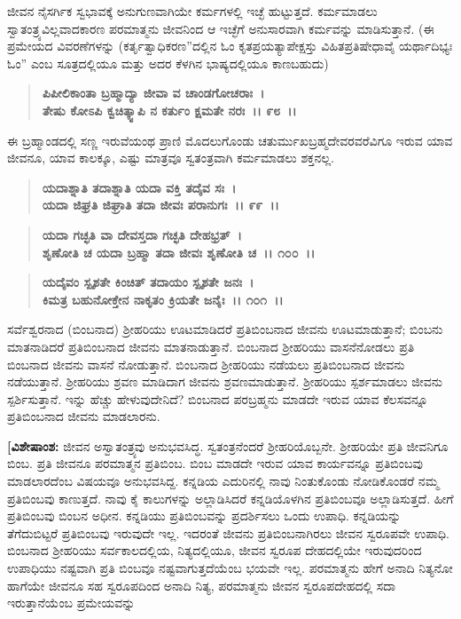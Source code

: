 ಜೀವನ ನೈಸರ್ಗಿಕ ಸ್ವಭಾವಕ್ಕೆ ಅನುಗುಣವಾಗಿಯೇ ಕರ್ಮಗಳಲ್ಲಿ ಇಚ್ಛೆ ಹುಟ್ಟುತ್ತದೆ. ಕರ್ಮಮಾಡಲು ಸ್ವಾತಂತ್ರ್ಯವಿಲ್ಲವಾದಕಾರಣ ಪರಮಾತ್ಮನು ಜೀವನಿಂದ ಆ ಇಚ್ಛೆಗೆ ಅನುಸಾರವಾಗಿ ಕರ್ಮವನ್ನು ಮಾಡಿಸುತ್ತಾನೆ. (ಈ ಪ್ರಮೇಯದ ವಿವರಣೆಗಳನ್ನು (ಕರ್ತೃತ್ವಾಧಿಕರಣ”ದಲ್ಲಿನ ಓಂ ಕೃತಪ್ರಯತ್ಯಾಪೇಕ್ಷಸ್ತು ವಿಹಿತಪ್ರತಿಷೇಧಾವೈ ಯರ್ಥಾದಿಭ್ಯಃ ಓಂ” ಎಂಬ ಸೂತ್ರದಲ್ಲಿಯೂ ಮತ್ತು ಅದರ ಕೆಳಗಿನ ಭಾಷ್ಯದಲ್ಲಿಯೂ ಕಾಣಬಹುದು)

\begin{verse}
\textbf{ಪಿಪೀಲಿಕಾಂತಾ ಬ್ರಹ್ಮಾದ್ಯಾ ಜೀವಾ ವ ಚಾಂಡಗೋಚರಾಃ~।}\\\textbf{ತೇಷು ಕೋಽಪಿ ಕ್ವಚಿತ್ಕ್ವಾಪಿ ನ ಕರ್ತುಂ ಕ್ಷಮತೇ ನರಃ~।। ೯೮~।।}
\end{verse}

ಈ ಬ್ರಹ್ಮಾಂಡದಲ್ಲಿ ಸಣ್ಣ ಇರುವೆಯಂಥ ಪ್ರಾಣಿ ಮೊದಲುಗೊಂಡು ಚತುರ್ಮುಖಬ್ರಹ್ಮದೇವರವರೆವಿಗೂ ಇರುವ ಯಾವ ಜೀವನೂ, ಯಾವ ಕಾಲಕ್ಕೂ, ಎಷ್ಟು ಮಾತ್ರವೂ ಸ್ವತಂತ್ರವಾಗಿ ಕರ್ಮಮಾಡಲು ಶಕ್ತನಲ್ಲ.

\begin{verse}
\textbf{ಯದಾಶ್ನಾತಿ ತದಾಶ್ನಾತಿ ಯದಾ ವಕ್ತಿ ತದೈವ ಸಃ~।}\\\textbf{ಯದಾ ಜಿಘ್ರತಿ ಜಿಘ್ರಾತಿ ತದಾ ಜೀವಃ ಪರಾನುಗಃ~।। ೯೯~।।} 
\end{verse}

\begin{verse}
\textbf{ಯದಾ ಗಚ್ಛತಿ ವಾ ದೇವಸ್ತದಾ ಗಚ್ಛತಿ ದೇಹಭ್ರತ್~।}\\\textbf{ಶೃಣೋತಿ ಚ ಯದಾ ಬ್ರಹ್ಮಾ ತದಾ ಜೀವಃ ಶೃಣೋತಿ ಚ~।। ೧೦೦~।।} 
\end{verse}

\begin{verse}
\textbf{ಯದೈವಂ ಸ್ಪೃಶತೇ ಕಿಂಚಿತ್ ತದಾಯಂ ಸ್ಪೃಶತೇ ಜನಃ~।}\\\textbf{ಕಿಮತ್ರ ಬಹುನೋಕ್ತೇನ ನಾಕೃತಂ ಕ್ರಿಯತೇ ಜನೈಃ~।। ೧೦೧~।।}
\end{verse}

ಸರ್ವೆಶ್ವರನಾದ (ಬಿಂಬನಾದ) ಶ‍್ರೀಹರಿಯು ಊಟಮಾಡಿದರೆ ಪ್ರತಿಬಿಂಬನಾದ ಜೀವನು ಊಟಮಾಡುತ್ತಾನೆ; ಬಿಂಬನು ಮಾತನಾಡಿದರೆ ಪ್ರತಿಬಿಂಬನಾದ ಜೀವನು ಮಾತ\-ನಾಡುತ್ತಾನೆ. ಬಿಂಬನಾದ ಶ‍್ರೀಹರಿಯು ವಾಸನೆನೋಡಲು ಪ್ರತಿ ಬಿಂಬನಾದ ಜೀವನು ವಾಸನೆ ನೋಡುತ್ತಾನೆ. ಬಿಂಬನಾದ ಶ‍್ರೀಹರಿಯು ನಡೆಯಲು ಪ್ರತಿಬಿಂಬನಾದ ಜೀವನು ನಡೆಯುತ್ತಾನೆ. ಶ‍್ರೀಹರಿಯು ಶ್ರವಣ ಮಾಡಿದಾಗ ಜೀವನು ಶ್ರವಣಮಾಡುತ್ತಾನೆ. ಶ‍್ರೀಹರಿಯು ಸ್ಪರ್ಶಮಾಡಲು ಜೀವನು ಸ್ಪರ್ಶಿಸುತ್ತಾನೆ. ಇನ್ನು ಹೆಚ್ಚು ಹೇಳುವುದೇನಿದೆ? ಬಿಂಬನಾದ ಪರಬ್ರಹ್ಮನು ಮಾಡದೇ ಇರುವ ಯಾವ ಕೆಲಸವನ್ನೂ ಪ್ರತಿಬಿಂಬನಾದ ಜೀವನು ಮಾಡಲಾರನು.

\textbf{[ವಿಶೇಷಾಂಶ:} ಜೀವನ ಅಸ್ವಾತಂತ್ರ್ಯವು ಅನುಭವಸಿದ್ಧ. ಸ್ವತಂತ್ರನೆಂದರೆ ಶ‍್ರೀಹರಿ\-ಯೊಬ್ಬನೇ. ಶ‍್ರೀಹರಿಯೇ ಪ್ರತಿ ಜೀವನಿಗೂ ಬಿಂಬ. ಪ್ರತಿ ಜೀವನೂ ಪರಮಾತ್ಮನ ಪ್ರತಿಬಿಂಬ. ಬಿಂಬ ಮಾಡದೇ ಇರುವ ಯಾವ ಕಾರ್ಯವನ್ನೂ ಪ್ರತಿಬಿಂಬವು ಮಾಡಲಾರದೆಂಬ ವಿಷಯವೂ ಅನುಭವಸಿದ್ದ. ಕನ್ನಡಿಯ ಎದುರಿನಲ್ಲಿ ನಾವು ನಿಂತುಕೊಂಡು ನೋಡಿಕೊಂಡರೆ ನಮ್ಮ ಪ್ರತಿಬಿಂಬವು ಕಾಣುತ್ತದೆ. ನಾವು ಕೈ ಕಾಲುಗಳನ್ನು ಅಲ್ಲಾಡಿಸಿದರೆ ಕನ್ನಡಿಯೊಳಗಿನ ಪ್ರತಿಬಿಂಬವೂ ಅಲ್ಲಾಡಿಸುತ್ತದೆ. ಹೀಗೆ ಪ್ರತಿಬಿಂಬವು ಬಿಂಬನ ಅಧೀನ. ಕನ್ನಡಿಯು ಪ್ರತಿಬಿಂಬವನ್ನು ಪ್ರದರ್ಶಿಸಲು ಒಂದು ಉಪಾಧಿ. ಕನ್ನಡಿಯನ್ನು ತೆಗೆದುಬಿಟ್ಟರೆ ಪ್ರತಿಬಿಂಬವು ಇರುವುದೇ ಇಲ್ಲ. ಇದರಂತೆ ಜೀವನು ಪ್ರತಿಬಿಂಬನಾಗಿರಲು ಜೀವನ ಸ್ವರೂಪವೇ ಉಪಾಧಿ. ಬಿಂಬನಾದ ಶ‍್ರೀಹರಿಯು ಸರ್ವಕಾಲದಲ್ಲಿಯ, ನಿತ್ಯದಲ್ಲಿಯೂ, ಜೀವನ ಸ್ವರೂಪ ದೇಹದಲ್ಲಿಯೇ ಇರುವುದರಿಂದ ಉಪಾಧಿಯು ನಷ್ಟವಾಗಿ ಪ್ರತಿ ಬಿಂಬವೂ ನಷ್ಟವಾಗುತ್ತದೆಯೆಂಬ ಭಯವೇ ಇಲ್ಲ. ಪರಮಾತ್ಮನು ಹೇಗೆ ಅನಾದಿ ನಿತ್ಯನೋ ಹಾಗೆಯೇ ಜೀವನೂ ಸಹ ಸ್ವರೂಪ\-ದಿಂದ ಅನಾದಿ ನಿತ್ಯ, ಪರಮಾತ್ಮನು ಜೀವನ ಸ್ವರೂಪದೇಹದಲ್ಲಿ ಸದಾ ಇರುತ್ತಾನೆಯೆಂಬ ಪ್ರಮೇಯವನ್ನು

